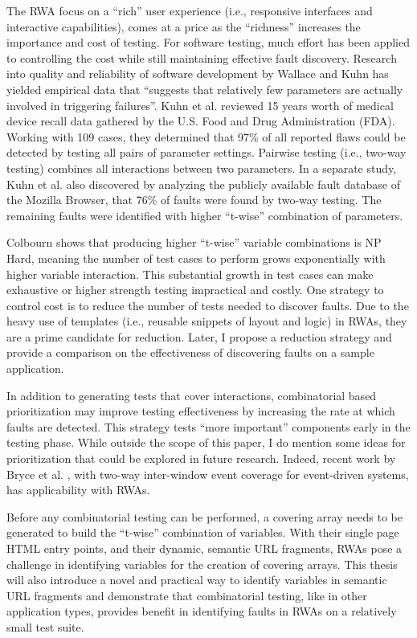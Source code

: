 The RWA focus on a ``rich'' user experience (i.e., responsive interfaces and interactive capabilities)\cite{paulson2005building}, comes at a price as the ``richness'' increases the importance and cost of testing.  For software testing, much effort has been applied to controlling the cost while still maintaining effective fault discovery.  Research into quality and reliability of software development by Wallace and Kuhn has yielded empirical data that ``suggests that relatively few parameters are actually involved in triggering failures''\cite{kuhn2004software}.  Kuhn et al. reviewed 15 years worth of medical device recall data gathered by the U.S. Food and Drug Administration (FDA).  Working with 109 cases, they determined that 97\% of all reported flaws could be detected by testing all pairs of parameter settings\cite{kuhn2004software}.  Pairwise testing (i.e., two-way testing) combines all interactions between two parameters.  In a separate study, Kuhn et al. also discovered by analyzing the publicly available fault database of the Mozilla Browser, that 76\% of faults were found by two-way testing\cite{kuhn2002investigation}.  The remaining faults were identified with higher ``t-wise'' combination of parameters.  

Colbourn shows that producing higher ``t-wise'' variable combinations is NP Hard\cite{colbourn2004combinatorial}, meaning the number of test cases to perform grows exponentially with higher variable interaction.  This substantial growth in test cases can make exhaustive or higher strength testing impractical and costly.  One strategy to control cost is to reduce the number of tests needed to discover faults.  Due to the heavy use of templates (i.e., reusable snippets of layout and logic) in RWAs, they are a prime candidate for reduction.  Later, I propose a reduction strategy and provide a comparison on the effectiveness of discovering faults on a sample application.

In addition to generating tests that cover interactions, combinatorial based prioritization may improve testing effectiveness by increasing the rate at which faults are detected.  This strategy tests ``more important'' components early in the testing phase.  While outside the scope of this paper, I do mention some ideas for prioritization that could be explored in future research.  Indeed, recent work by Bryce et al. \cite{bryce2007test, bryce2011developing, sampath2008prioritizing}, with two-way inter-window event coverage for event-driven systems, has applicability with RWAs.

Before any combinatorial testing can be performed, a covering array needs to be generated to build the ``t-wise'' combination of variables.  With their single page HTML entry points, and their dynamic, semantic URL fragments, RWAs pose a challenge in identifying variables for the creation of covering arrays.  This thesis will also introduce a novel and practical way to identify variables in semantic URL fragments and demonstrate that combinatorial testing, like in other application types, provides benefit in identifying faults in RWAs on a relatively small test suite.
